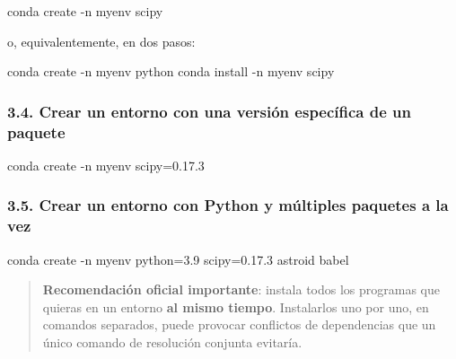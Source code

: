 \documentclass[
  doc,
  floatsintext,
  longtable,
  a4paper,
  nolmodern,
  notxfonts,
  notimes,
  12pt,
  colorlinks=true,linkcolor=blue,citecolor=blue,urlcolor=blue]{apa7}
\newenvironment{Shaded}{\begin{snugshade}}{\end{snugshade}}
\newcommand{\AttributeTok}[1]{\textcolor[rgb]{0.40,0.45,0.13}{#1}}
\newcommand{\ExtensionTok}[1]{\textcolor[rgb]{0.00,0.23,0.31}{#1}}
\newcommand{\NormalTok}[1]{\textcolor[rgb]{0.00,0.23,0.31}{#1}}
\begin{document}
\begin{Shaded}
\begin{Highlighting}[]
\ExtensionTok{conda}\NormalTok{ create }\AttributeTok{{-}n}\NormalTok{ myenv scipy}
\end{Highlighting}
\end{Shaded}

o, equivalentemente, en dos pasos:

\begin{Shaded}
\begin{Highlighting}[]
\ExtensionTok{conda}\NormalTok{ create }\AttributeTok{{-}n}\NormalTok{ myenv python}
\ExtensionTok{conda}\NormalTok{ install }\AttributeTok{{-}n}\NormalTok{ myenv scipy}
\end{Highlighting}
\end{Shaded}

\subsubsection{3.4. Crear un entorno con una versión específica de un
paquete}\label{crear-un-entorno-con-una-versiuxf3n-especuxedfica-de-un-paquete}

\begin{Shaded}
\begin{Highlighting}[]
\ExtensionTok{conda}\NormalTok{ create }\AttributeTok{{-}n}\NormalTok{ myenv scipy=0.17.3}
\end{Highlighting}
\end{Shaded}

\subsubsection{3.5. Crear un entorno con Python y múltiples paquetes a
la
vez}\label{crear-un-entorno-con-python-y-muxfaltiples-paquetes-a-la-vez}

\begin{Shaded}
\begin{Highlighting}[]
\ExtensionTok{conda}\NormalTok{ create }\AttributeTok{{-}n}\NormalTok{ myenv python=3.9 scipy=0.17.3 astroid babel}
\end{Highlighting}
\end{Shaded}

\begin{quote}
\textbf{Recomendación oficial importante}: instala todos los programas
que quieras en un entorno \textbf{al mismo tiempo}. Instalarlos uno por
uno, en comandos separados, puede provocar conflictos de dependencias
que un único comando de resolución conjunta evitaría.
\end{quote}
\end{document}

